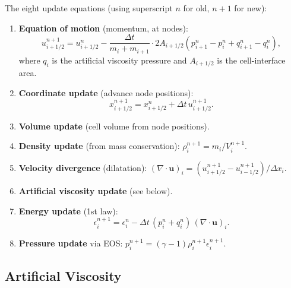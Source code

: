 The eight update equations (using superscript $n$ for old,
$n+1$ for new):

\begin{enumerate}
  \item \textbf{Equation of motion} (momentum, at nodes):
        \begin{equation}
          u_{i+1/2}^{n+1} = u_{i+1/2}^n
          - \frac{\Delta t}{m_i + m_{i+1}}\cdot 2A_{i+1/2}
            \left(p_{i+1}^n - p_i^n + q_{i+1}^n - q_i^n\right),
          \label{eq:lec19:eom}
        \end{equation}
        where $q_i$ is the artificial viscosity pressure and $A_{i+1/2}$
        is the cell-interface area.

  \item \textbf{Coordinate update} (advance node positions):
        \begin{equation}
          x_{i+1/2}^{n+1} = x_{i+1/2}^n + \Delta t\, u_{i+1/2}^{n+1}.
        \end{equation}

  \item \textbf{Volume update} (cell volume from node positions).

  \item \textbf{Density update} (from mass conservation):
        $\rho_i^{n+1} = m_i / V_i^{n+1}$.

  \item \textbf{Velocity divergence} (dilatation):
        $(\nabla\cdot\mathbf{u})_i = (u_{i+1/2}^{n+1}-u_{i-1/2}^{n+1})/\Delta x_i$.

  \item \textbf{Artificial viscosity update} (see below).

  \item \textbf{Energy update} (1st law):
        \begin{equation}
          \epsilon_i^{n+1} = \epsilon_i^n
          - \Delta t\,(p_i^n + q_i^n)\,(\nabla\cdot\mathbf{u})_i.
          \label{eq:lec19:energy}
        \end{equation}

  \item \textbf{Pressure update} via EOS: $p_i^{n+1} = (\gamma-1)\rho_i^{n+1}\epsilon_i^{n+1}$.
\end{enumerate}

\subsection{Artificial Viscosity}\label{subsec:lec19:artvis}


